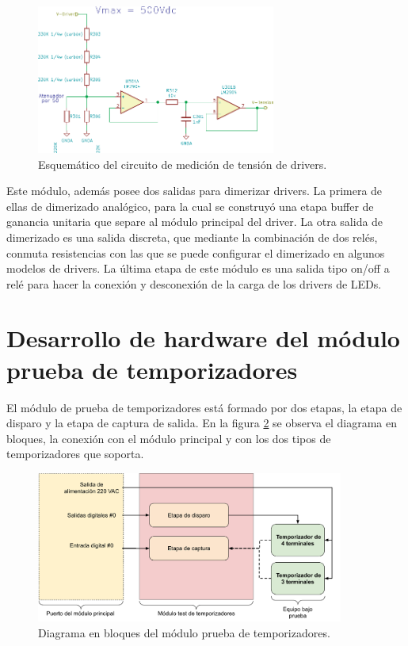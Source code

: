 \begin{figure}[H]
	\centering
	\includegraphics[width=0.7\textwidth]{./Figures/MedicionTension.pdf}
	\caption{Esquemático del circuito de medición de tensión de drivers.}
	\label{fig:MedicionTension}
\end{figure}

Este módulo, además posee dos salidas para dimerizar drivers. La primera de ellas de dimerizado analógico, para la cual se construyó una etapa buffer de ganancia unitaria que separe al módulo principal del driver. La otra salida de dimerizado es una salida discreta, que mediante la combinación de dos relés, conmuta resistencias con las que se puede configurar el dimerizado en algunos modelos de drivers.
La última etapa de este módulo es una salida tipo on/off a relé para hacer la conexión y desconexión de la carga de los drivers de LEDs.


\section{Desarrollo de hardware del módulo prueba de temporizadores}

El módulo de prueba de temporizadores está formado por dos etapas, la etapa de disparo y la etapa de captura de salida. En la figura \ref{fig:BloquesTestTemp} se observa el diagrama en bloques, la conexión con el módulo principal y con los dos tipos de temporizadores que soporta.


\begin{figure}[H]
	\centering
	\includegraphics[width=0.9\textwidth]{./Figures/BloquesTestTemp.pdf}
	\caption{Diagrama en bloques del módulo prueba de temporizadores.}
	\label{fig:BloquesTestTemp}
\end{figure}


